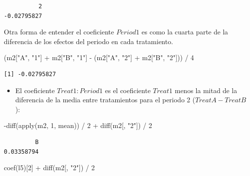 \documentclass[
  12pt,
  a4paper,
  extrafontsizes,
  onecolumn,
  openright]{memoir}
\newenvironment{Shaded}{\begin{snugshade}}{\end{snugshade}}
\newcommand{\DecValTok}[1]{\textcolor[rgb]{0.68,0.00,0.00}{#1}}
\newcommand{\FunctionTok}[1]{\textcolor[rgb]{0.28,0.35,0.67}{#1}}
\newcommand{\NormalTok}[1]{\textcolor[rgb]{0.00,0.23,0.31}{#1}}
\newcommand{\SpecialCharTok}[1]{\textcolor[rgb]{0.37,0.37,0.37}{#1}}
\newcommand{\StringTok}[1]{\textcolor[rgb]{0.13,0.47,0.30}{#1}}
\providecommand{\tightlist}{%
  \setlength{\itemsep}{0pt}\setlength{\parskip}{0pt}}\usepackage{longtable,booktabs,array}
\begin{document}
\begin{verbatim}
          2 
-0.02795827 
\end{verbatim}

\normalsize

Otra forma de entender el coeficiente \(Period1\) es como la cuarta
parte de la diferencia de los efectos del periodo en cada tratamiento.

\scriptsize

\begin{Shaded}
\begin{Highlighting}[]
\NormalTok{(m2[}\StringTok{"A"}\NormalTok{, }\StringTok{"1"}\NormalTok{] }\SpecialCharTok{+}\NormalTok{ m2[}\StringTok{"B"}\NormalTok{, }\StringTok{"1"}\NormalTok{] }\SpecialCharTok{{-}}\NormalTok{ (m2[}\StringTok{"A"}\NormalTok{, }\StringTok{"2"}\NormalTok{] }\SpecialCharTok{+}\NormalTok{ m2[}\StringTok{"B"}\NormalTok{, }\StringTok{"2"}\NormalTok{])) }\SpecialCharTok{/} \DecValTok{4}
\end{Highlighting}
\end{Shaded}

\begin{verbatim}
[1] -0.02795827
\end{verbatim}

\normalsize

\begin{itemize}
\tightlist
\item
  El coeficiente \(Treat1:Period1\) es el coeficiente \(Treat1\) menos
  la mitad de la diferencia de la media entre tratamientos para el
  periodo 2 (\(TreatA-TreatB\)):
\end{itemize}

\scriptsize

\begin{Shaded}
\begin{Highlighting}[]
\SpecialCharTok{{-}}\FunctionTok{diff}\NormalTok{(}\FunctionTok{apply}\NormalTok{(m2, }\DecValTok{1}\NormalTok{, mean)) }\SpecialCharTok{/} \DecValTok{2} \SpecialCharTok{+} \FunctionTok{diff}\NormalTok{(m2[, }\StringTok{"2"}\NormalTok{]) }\SpecialCharTok{/} \DecValTok{2}
\end{Highlighting}
\end{Shaded}

\begin{verbatim}
         B 
0.03358794 
\end{verbatim}

\begin{Shaded}
\begin{Highlighting}[]
\FunctionTok{coef}\NormalTok{(l5)[}\DecValTok{2}\NormalTok{] }\SpecialCharTok{+} \FunctionTok{diff}\NormalTok{(m2[, }\StringTok{"2"}\NormalTok{]) }\SpecialCharTok{/} \DecValTok{2}
\end{Highlighting}
\end{Shaded}
\end{document}
